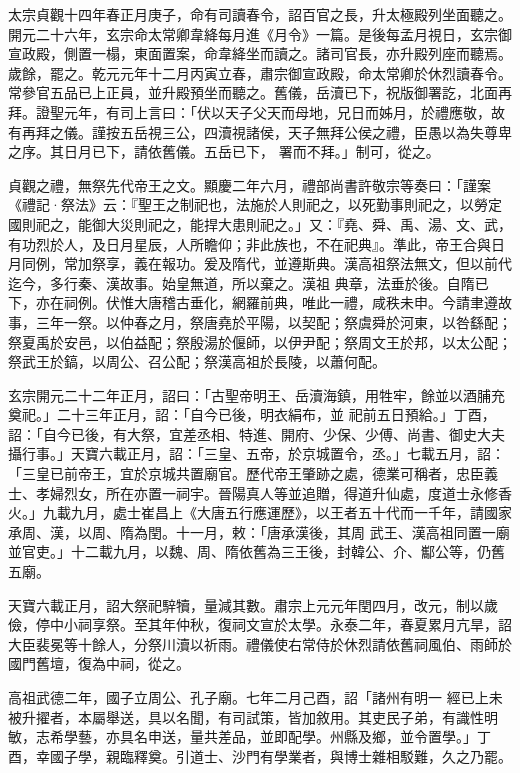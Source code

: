 \begin{pinyinscope}
 太宗貞觀十四年春正月庚子，命有司讀春令，詔百官之長，升太極殿列坐面聽之。開元二十六年，玄宗命太常卿韋絳每月進《月令》一篇。是後每孟月視日，玄宗御
 宣政殿，側置一榻，東面置案，命韋絳坐而讀之。諸司官長，亦升殿列座而聽焉。歲餘，罷之。乾元元年十二月丙寅立春，肅宗御宣政殿，命太常卿於休烈讀春令。常參官五品已上正員，並升殿預坐而聽之。舊儀，岳瀆已下，祝版御署訖，北面再拜。證聖元年，有司上言曰：「伏以天子父天而母地，兄日而姊月，於禮應敬，故有再拜之儀。謹按五岳視三公，四瀆視諸侯，天子無拜公侯之禮，臣愚以為失尊卑之序。其日月已下，請依舊儀。五岳已下，
 署而不拜。」制可，從之。



 貞觀之禮，無祭先代帝王之文。顯慶二年六月，禮部尚書許敬宗等奏曰：「謹案《禮記·祭法》云：『聖王之制祀也，法施於人則祀之，以死勤事則祀之，以勞定國則祀之，能御大災則祀之，能捍大患則祀之。」又：『堯、舜、禹、湯、文、武，有功烈於人，及日月星辰，人所瞻仰；非此族也，不在祀典』。準此，帝王合與日月同例，常加祭享，義在報功。爰及隋代，並遵斯典。漢高祖祭法無文，但以前代迄今，多行秦、漢故事。始皇無道，所以棄之。漢祖
 典章，法垂於後。自隋已下，亦在祠例。伏惟大唐稽古垂化，網羅前典，唯此一禮，咸秩未申。今請聿遵故事，三年一祭。以仲春之月，祭唐堯於平陽，以契配；祭虞舜於河東，以咎繇配；祭夏禹於安邑，以伯益配；祭殷湯於偃師，以伊尹配；祭周文王於邦，以太公配；祭武王於鎬，以周公、召公配；祭漢高祖於長陵，以蕭何配。



 玄宗開元二十二年正月，詔曰：「古聖帝明王、岳瀆海鎮，用牲牢，餘並以酒脯充奠祀。」二十三年正月，詔：「自今已後，明衣絹布，並
 祀前五日預給。」丁酉，詔：「自今已後，有大祭，宜差丞相、特進、開府、少保、少傅、尚書、御史大夫攝行事。」天寶六載正月，詔：「三皇、五帝，於京城置令，丞。」七載五月，詔：「三皇已前帝王，宜於京城共置廟官。歷代帝王肇跡之處，德業可稱者，忠臣義士、孝婦烈女，所在亦置一祠宇。晉陽真人等並追贈，得道升仙處，度道士永修香火。」九載九月，處士崔昌上《大唐五行應運歷》，以王者五十代而一千年，請國家承周、漢，以周、隋為閏。十一月，敕：「唐承漢後，其周
 武王、漢高祖同置一廟並官吏。」十二載九月，以魏、周、隋依舊為三王後，封韓公、介、酅公等，仍舊五廟。



 天寶六載正月，詔大祭祀騂犢，量減其數。肅宗上元元年閏四月，改元，制以歲儉，停中小祠享祭。至其年仲秋，復祠文宣於太學。永泰二年，春夏累月亢旱，詔大臣裴冕等十餘人，分祭川瀆以祈雨。禮儀使右常侍於休烈請依舊祠風伯、雨師於國門舊壇，復為中祠，從之。



 高祖武德二年，國子立周公、孔子廟。七年二月己酉，詔「諸州有明一
 經已上未被升擢者，本屬舉送，具以名聞，有司試策，皆加敘用。其吏民子弟，有識性明敏，志希學藝，亦具名申送，量共差品，並即配學。州縣及鄉，並令置學。」丁酉，幸國子學，親臨釋奠。引道士、沙門有學業者，與博士雜相駁難，久之乃罷。




\end{pinyinscope}

